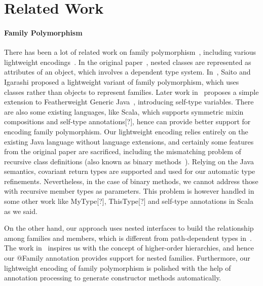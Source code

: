 \section{Related Work}\label{sec:relatedwork}

\paragraph{Family Polymorphism}

There has been a lot of related work on family polymorphism~\cite{ernst2001family}, including various lightweight encodings~\cite{Kamina:2007:LSC:1289971.1289996,saito2007essence,igarashi2005lightweight,Kamina:2008:LDC:1449913.1449932}. In the original
paper~\cite{ernst2001family}, nested classes are represented as attributes of an object, which involves a dependent type system. In~\cite{igarashi2005lightweight}, Saito and Igarashi
proposed a lightweight variant of family polymorphism, which uses classes rather than objects to represent families. Later work in~\cite{igarashi2005lightweight}
proposes a simple extension to Featherweight Generic Java~\cite{Igarashi:2001:FJM:503502.503505}, introducing self-type variables. There are also some existing languages,
like Scala, which supports symmetric mixin compositions and self-type annotations[?], hence can provide better support for encoding family
polymorphism. Our lightweight encoding relies entirely on the existing Java language without language extensions, and certainly some features from
the original paper are sacrificed, including the mismatching problem of recursive class definitions (also known as binary methods~\cite{bruce1995binary}). Relying
on the Java semantics, covariant return types are supported and used for our automatic type refinements. Nevertheless, in the case of binary methods,
we cannot address those with recursive member types as parameters. This problem is however handled in some other work like MyType[?], ThisType[?] and self-type
annotations in Scala as we said.

On the other hand, our approach uses nested interfaces to build the relationship among families and members, which is different from
path-dependent types in~\cite{ernst2001family}. The work in~\cite{ernst2003higher} inspires us with the concept of higher-order hierarchies, and hence our \textsf{@Family} annotation
provides support for nested families. Furthermore, our lightweight encoding of family polymorphism is polished with the help of annotation processing
to generate constructor methods automatically.

